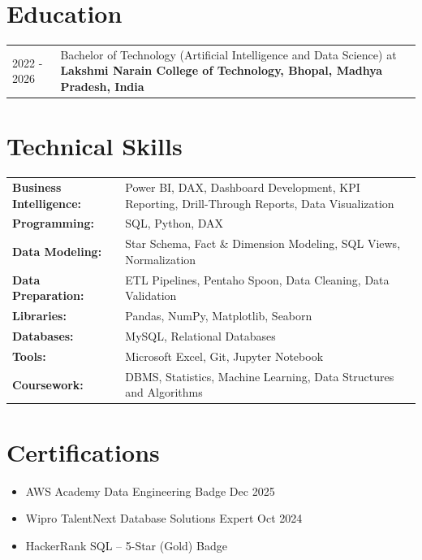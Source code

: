 \documentclass[a4paper,10pt]{article}
\begin{document}
\section{Education}
\begin{tabularx}{\linewidth}{@{}l X@{}}
2022 - 2026 & Bachelor of Technology (Artificial Intelligence and Data Science) at \textbf{Lakshmi Narain College of Technology, Bhopal, Madhya Pradesh, India} \\
\end{tabularx}

\section{Technical Skills}
\begin{tabularx}{\linewidth}{@{}l X@{}}
\textbf{Business Intelligence:} & Power BI, DAX, Dashboard Development, KPI Reporting, Drill-Through Reports, Data Visualization \\
\textbf{Programming:} & SQL, Python, DAX \\
\textbf{Data Modeling:} & Star Schema, Fact \& Dimension Modeling, SQL Views, Normalization \\
\textbf{Data Preparation:} & ETL Pipelines, Pentaho Spoon, Data Cleaning, Data Validation \\
\textbf{Libraries:} & Pandas, NumPy, Matplotlib, Seaborn \\
\textbf{Databases:} & MySQL, Relational Databases \\
\textbf{Tools:} & Microsoft Excel, Git, Jupyter Notebook \\
\textbf{Coursework:} & DBMS, Statistics, Machine Learning, Data Structures and Algorithms \\
\end{tabularx}

\section{Certifications}
\begin{itemize}[leftmargin=1em, itemsep=1pt, label=--, nosep]
    \item AWS Academy Data Engineering Badge \hfill Dec 2025
    \item Wipro TalentNext Database Solutions Expert \hfill Oct 2024
    \item HackerRank SQL -- 5-Star (Gold) Badge
\end{itemize}
\end{document}

